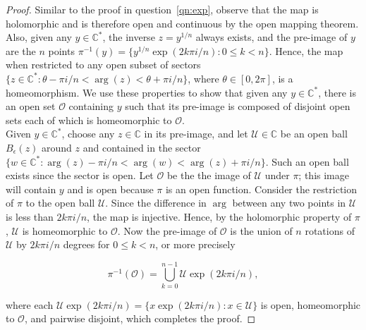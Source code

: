 \documentclass{article}
\begin{document}
\begin{enumerate}
\begin{enumerate}
\begin{enumerate}
            \begin{proof}
              Similar to the proof in question~\ref{qn:exp}, observe that
              the map is holomorphic and is therefore open and continuous
              by the open mapping theorem. Also, given any
              $y\in\mathbb{C}^*$, the inverse $z=y^{1/n}$ always exists,
              and the pre-image of $y$ are the $n$ points
              $\pi^{-1}(y)=\{y^{1/n}\exp(2k\pi i/n):0\leq k<n\}$. Hence,
              the map when restricted to any open subset of sectors
              $\{z\in\mathbb{C}^*:\theta-\pi i/n<\arg(z)<\theta+\pi i/n\}$,
              where $\theta\in[0,2\pi]$, is a homeomorphism. We use
              these properties to show that given any $y\in\mathbb{C}^*$,
              there is an open set $\mathcal{O}$ containing $y$ such that
              its pre-image is composed of disjoint open sets each of which
              is homeomorphic to $\mathcal{O}$. \\

              Given $y\in\mathbb{C}^*$, choose any $z\in\mathbb{C}$ in
              its pre-image, and let $\mathcal{U}\in\mathbb{C}$ be an open
              ball $B_\epsilon(z)$ around $z$ and contained in the sector
              $\{w\in\mathbb{C}^*:\arg(z)-\pi i/n<\arg(w)<\arg(z)+\pi
              i/n\}$. Such an open ball exists since the sector is open.
              Let $\mathcal{O}$ be the the image of $\mathcal{U}$ under
              $\pi$; this image will contain $y$ and is open because $\pi$
              is an open function. Consider the restriction of $\pi$ to the
              open ball $\mathcal{U}$. Since the difference in $\arg$
              between any two points in $\mathcal{U}$ is less than $2k\pi
              i/n$, the map is injective. Hence, by the holomorphic
              property of $\pi$, $\mathcal{U}$ is homeomorphic to
              $\mathcal{O}$. Now the pre-image of $\mathcal{O}$ is the
              union of $n$ rotations of $\mathcal{U}$ by $2k\pi i/n$
              degrees for $0\leq k<n$, or more precisely

              \begin{equation*}
                \pi^{-1}(\mathcal{O}) = \bigcup\limits_{k=0}^{n-1}
                \mathcal{U}\exp(2k\pi i/n),
              \end{equation*}

              where each $\mathcal{U}\exp(2k\pi i/n)=\{x\exp(2k\pi
              i/n):x\in\mathcal{U}\}$ is open, homeomorphic to
              $\mathcal{O}$, and pairwise disjoint, which completes
              the proof.
            \end{proof}
        \end{enumerate}


\end{enumerate}
\end{enumerate}
\end{document}
